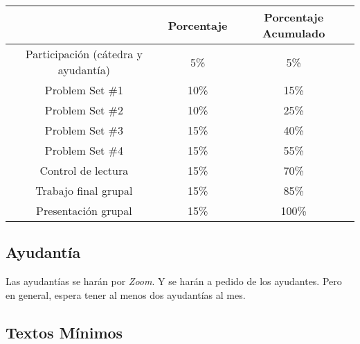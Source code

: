 \documentclass[letterpaper]{article}
\begin{document}
\begin{table}[h]
\centering
\begin{tabular}{ccc}
							& \textbf{Porcentaje} 		& {\bf Porcentaje Acumulado} \\
							\hline
Participaci\'on (c\'atedra y ayudant\'ia) 	& 5\%       & 5\%                 \\
\hline
Problem Set \#1 							              & 10\% 		& 15\%                 \\
Problem Set \#2 							              & 10\% 		& 25\%                 \\
Problem Set \#3 							              & 15\% 		& 40\%                 \\
Problem Set \#4                             & 15\%    & 55\%                 \\
\hline
Control de lectura 							            & 15\% 		& 70\% \\
\hline
Trabajo final grupal                        & 15\%    & 85\% \\
Presentaci\'on grupal                       & 15\%    & 100\% \\
\hline             
\end{tabular}
\end{table}

\subsection*{Ayudant\'ia}

Las ayudant\'ias se har\'an por \emph{Zoom}. Y se har\'an a pedido de los ayudantes. Pero en general, espera tener al menos dos ayudant\'ias al mes.


\subsection*{Textos M\'inimos}
\end{document}
